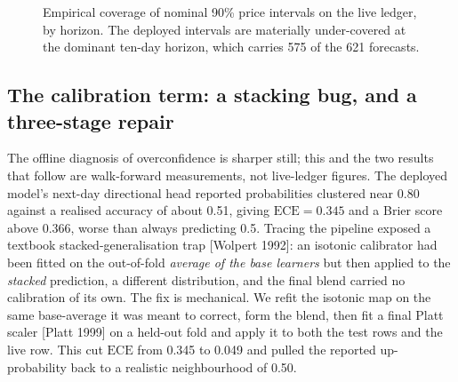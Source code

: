 \documentclass[10pt, a4paper, oneside]{article}
\theoremstyle{definition}
\theoremstyle{plain}
\newcommand{\ece}{\mathrm{ECE}}
\begin{document}
\begin{figure}[t]
\centering
{}
\caption{Empirical coverage of nominal 90\% price intervals on the live ledger, by
horizon. The deployed intervals are materially under-covered at the dominant ten-day
horizon, which carries 575 of the 621 forecasts.}
\label{fig:cov}
\end{figure}

\subsection{The calibration term: a stacking bug, and a three-stage repair}
\label{sec:resultcal}
The offline diagnosis of overconfidence is sharper still; this and the two results
that follow are walk-forward measurements, not live-ledger figures. The deployed
model's next-day directional head reported probabilities clustered near 0.80 against a
realised accuracy of about 0.51, giving $\ece=0.345$ and a Brier score above 0.366,
worse than always predicting 0.5. Tracing the pipeline exposed a textbook
stacked-generalisation trap [Wolpert 1992]: an isotonic calibrator had been fitted on
the out-of-fold \emph{average of the base learners} but then applied to the
\emph{stacked} prediction, a different distribution, and the final blend carried no
calibration of its own. The fix is mechanical. We refit the isotonic map on the same
base-average it was meant to correct, form the blend, then fit a final Platt scaler
[Platt 1999] on a held-out fold and apply it to both the test rows and the live row.
This cut $\ece$ from 0.345 to 0.049 and pulled the reported up-probability back to a
realistic neighbourhood of 0.50.
\end{document}
